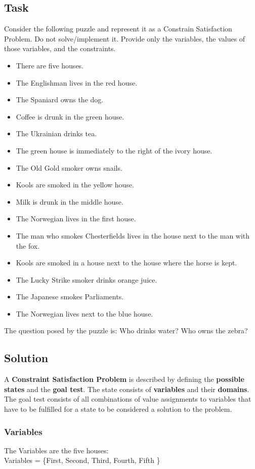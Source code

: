 \documentclass[paper=a4, fontsize=11pt]{scrartcl} %
\numberwithin{equation}{section} %
\numberwithin{figure}{section} %
\numberwithin{table}{section} %
\begin{document}
\subsection{Task}
Consider the following puzzle and represent it as a Constrain Satisfaction Problem. Do
not solve/implement it. Provide only the variables, the values of those variables, and the
constraints.
\begin{itemize}
\item There are five houses.
\item The Englishman lives in the red house.
\item The Spaniard owns the dog.
\item Coffee is drunk in the green house.
\item The Ukrainian drinks tea.
\item The green house is immediately to the right of the ivory house.
\item The Old Gold smoker owns snails.
\item Kools are smoked in the yellow house.
\item Milk is drunk in the middle house.
\item The Norwegian lives in the first house.
\item The man who smokes Chesterfields lives in the house next to the man with the fox.
\item Kools are smoked in a house next to the house where the horse is kept.
\item The Lucky Strike smoker drinks orange juice.
\item The Japanese smokes Parliaments.
\item The Norwegian lives next to the blue house.
\end{itemize}
The question posed by the puzzle is: Who drinks water? Who owns the zebra?

\subsection{Solution}
A \textbf{Constraint Satisfaction Problem} is described by defining the \textbf{possible states} and the \textbf{goal test}. The state consists of \textbf{variables} and their \textbf{domains}. The goal test consists of all combinations of value assignments to variables that have to be fulfilled for a state to be considered a solution to the problem.
\subsubsection{Variables}
The Variables are the five houses:\\
Variables = \{First, Second, Third, Fourth, Fifth \}
\end{document}
